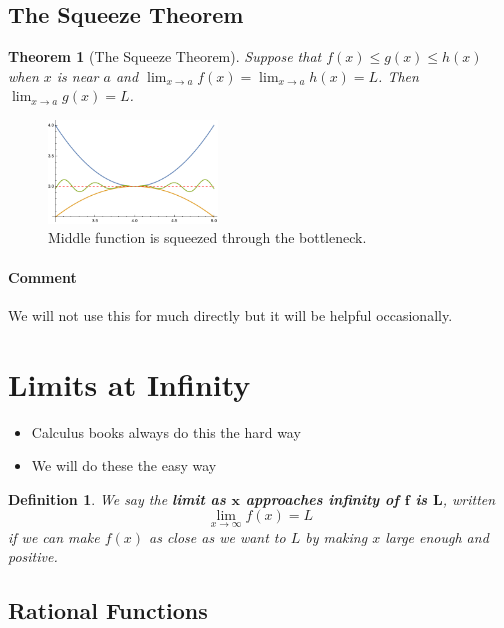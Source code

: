\documentclass[letterpaper, 11pt, openany]{book}
\theoremstyle{mytheoremstyle}
\newtheorem{theorem}{Theorem}[section]
\newtheorem{definition}{Definition}[section]
\theoremstyle{myexamplestyle}
\newenvironment{commentary}{\paragraph{\sffamily \smaller \fontseries{b}\selectfont Comment}}{}
\begin{document}
\subsection{The Squeeze Theorem}

\begin{theorem}[The Squeeze Theorem]\label{t:squuezethm}
    Suppose that \(f(x) \leq g(x) \leq h(x)\) when \(x\) is near \(a\) and \(\displaystyle \lim_{x \to a} f(x) = \lim_{x \to a} h(x) = L\). Then \(\displaystyle \lim_{x \to a} g(x) = L\).
\end{theorem}
\begin{figure}[htbp]
    \centering
        \includegraphics[width=0.4\textwidth]{Figures/squeezethm.pdf}
    \caption{Middle function is squeezed through the bottleneck.}
    \label{f:squeeze-thm}
\end{figure}
\begin{commentary}
    We will not use this for much directly but it will be helpful occasionally.
\end{commentary}

\section{Limits at Infinity}
\setcounter{figure}{0}

\begin{itemize}
    \item Calculus books always do this the hard way \faFrown
    \item We will do these the easy way \faSmile
\end{itemize}
\begin{definition}\label{d:limit-to-infty}
    We say the \textbf{limit as $\bm{x}$ approaches infinity of $\bm{f}$ is $\bm{L}$}, written
    \[
        \lim_{x \to \infty} f(x) = L    
    \]
    if we can make $f(x)$ as close as we want to $L$ by making $x$ large enough and positive.
\end{definition}
\subsection{Rational Functions}
\end{document}

